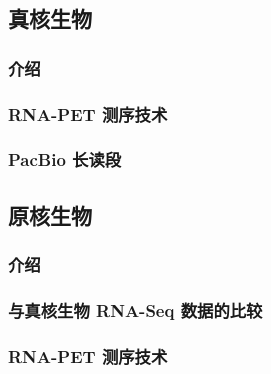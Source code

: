 \subsection{真核生物}

\subsubsection{介绍} %

\subsubsection{RNA-PET 测序技术} %

\subsubsection{PacBio 长读段} %

\subsection{原核生物}

\subsubsection{介绍} %

\subsubsection{与真核生物 RNA-Seq 数据的比较} %

\subsubsection{RNA-PET 测序技术} %





